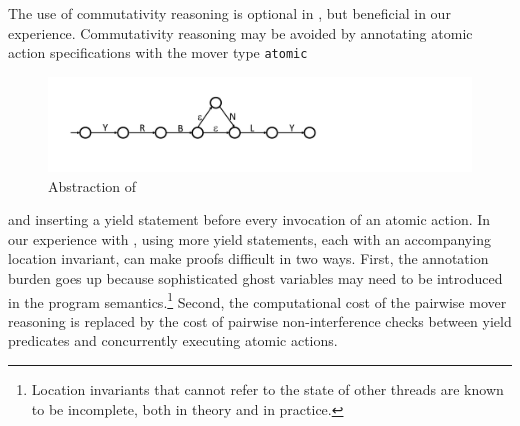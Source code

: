The use of commutativity reasoning is optional in \civl, but beneficial in our experience. 
Commutativity reasoning may be avoided by annotating atomic action specifications with the mover type {\tt atomic}
\begin{figure}
\vspace*{-1cm}
\begin{center}
\includegraphics[scale=0.25]{WBSlow.pdf}
\end{center}
\vspace*{-0.8cm}
\caption{Abstraction of }
\label{fig:midwb}
\end{figure}
and inserting a yield statement before every invocation of an atomic action.
In our experience with \civl, using more yield statements,
each with an accompanying location invariant, can make proofs difficult in two ways.
First, the annotation burden goes up because sophisticated ghost variables may need to be introduced in the 
program semantics.\footnote{Location invariants that cannot refer to the state of other threads are known to be incomplete, 
both in theory and in practice.}
Second, the computational cost of the pairwise mover reasoning is replaced by the cost of pairwise non-interference checks between yield predicates 
and concurrently executing atomic actions. 

